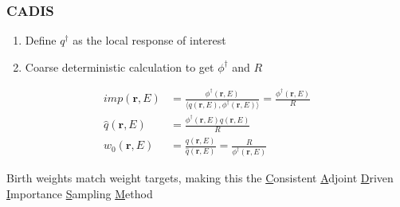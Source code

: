 \documentclass[handout]{beamer}
\renewcommand{\(}{\begin{columns}}
\renewcommand{\)}{\end{columns}}
\newcommand{\<}[1]{\begin{column}{#1}}
\renewcommand{\>}{\end{column}}
\newcommand{\ve}[1]{\ensuremath{\mathbf{#1}}}
\begin{document}
\begin{frame}[fragile]
  \frametitle{CADIS \cite{Wagner2007}}
  
  \begin{enumerate}
  \item Define $q^{\dagger}$ as the local response of interest\\
  \item Coarse deterministic calculation to get $\phi^{\dagger}$ and $R$
  \end{enumerate}
% 
\begin{align}
  imp(\ve{r}, E) &= \frac{\phi^{\dagger}(\ve{r}, E)}{\langle q(\ve{r}, E), \phi^{\dagger}(\ve{r}, E) \rangle} = \frac{\phi^{\dagger}(\ve{r}, E)}{R} \\
  \hat{q}(\ve{r}, E) &= \frac{\phi^{\dagger}(\ve{r}, E) q(\ve{r}, E)}{R} \\
  w_0(\ve{r}, E) &= \frac{q(\ve{r}, E)}{\hat{q}(\ve{r}, E)} = \frac{R}{\phi^{\dagger}(\ve{r}, E)} 
  \label{eq:Importance}
\end{align}

Birth weights match weight targets, making this the \underline{C}onsistent \underline{A}djoint \underline{D}riven \underline{I}mportance \underline{S}ampling \underline{M}ethod

\end{frame}
\end{document}
